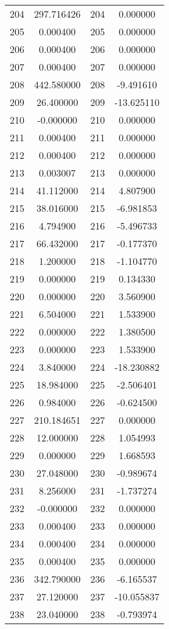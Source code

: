\documentclass[12pt]{article}
\begin{document}
\begin{longtable}{@{}cccc@{}}
204 & 297.716426 & 204 & 0.000000 \\
205 & 0.000400 & 205 & 0.000000 \\
206 & 0.000400 & 206 & 0.000000 \\
207 & 0.000400 & 207 & 0.000000 \\
208 & 442.580000 & 208 & -9.491610 \\
209 & 26.400000 & 209 & -13.625110 \\
210 & -0.000000 & 210 & 0.000000 \\
211 & 0.000400 & 211 & 0.000000 \\
212 & 0.000400 & 212 & 0.000000 \\
213 & 0.003007 & 213 & 0.000000 \\
214 & 41.112000 & 214 & 4.807900 \\
215 & 38.016000 & 215 & -6.981853 \\
216 & 4.794900 & 216 & -5.496733 \\
217 & 66.432000 & 217 & -0.177370 \\
218 & 1.200000 & 218 & -1.104770 \\
219 & 0.000000 & 219 & 0.134330 \\
220 & 0.000000 & 220 & 3.560900 \\
221 & 6.504000 & 221 & 1.533900 \\
222 & 0.000000 & 222 & 1.380500 \\
223 & 0.000000 & 223 & 1.533900 \\
224 & 3.840000 & 224 & -18.230882 \\
225 & 18.984000 & 225 & -2.506401 \\
226 & 0.984000 & 226 & -0.624500 \\
227 & 210.184651 & 227 & 0.000000 \\
228 & 12.000000 & 228 & 1.054993 \\
229 & 0.000000 & 229 & 1.668593 \\
230 & 27.048000 & 230 & -0.989674 \\
231 & 8.256000 & 231 & -1.737274 \\
232 & -0.000000 & 232 & 0.000000 \\
233 & 0.000400 & 233 & 0.000000 \\
234 & 0.000400 & 234 & 0.000000 \\
235 & 0.000400 & 235 & 0.000000 \\
236 & 342.790000 & 236 & -6.165537 \\
237 & 27.120000 & 237 & -10.055837 \\
238 & 23.040000 & 238 & -0.793974 \\

\end{longtable}
\end{document}
